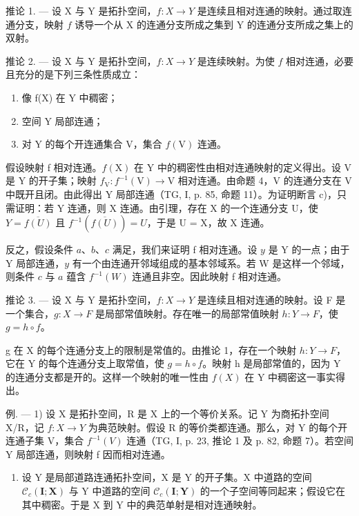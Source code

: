 推论 1. --- 设 X 与 Y 是拓扑空间，\(f: X \to Y\) 是连续且相对连通的映射。通过取连通分支，映射 \(f\) 诱导一个从 X 的连通分支所成之集到 Y 的连通分支所成之集上的双射。

推论 2. --- 设 X 与 Y 是拓扑空间，\(f: X \to Y\) 是连续映射。为使 \(f\) 相对连通，必要且充分的是下列三条性质成立：

\begin{enumerate}
\def\labelenumi{\alph{enumi})}
\item
  像 f(X) 在 Y 中稠密；
\item
  空间 Y 局部连通；
\item
  对 Y 的每个开连通集合 V，集合 \(f(\mathrm{V})\) 连通。
\end{enumerate}

假设映射 f 相对连通。\(f(\mathrm{X})\) 在 Y 中的稠密性由相对连通映射的定义得出。设 V 是 Y 的开子集；映射 \(f_{\mathrm{V}}: f^{-1}(\mathrm{V}) \to \mathrm{V}\) 相对连通。由命题 4，V 的连通分支在 V 中既开且闭。由此得出 Y 局部连通（TG, I, p. 85, 命题 11）。为证明断言 c)，只需证明：若 Y 连通，则 X 连通。由引理，存在 X 的一个连通分支 U，使 \(Y = \overline{f(U)}\) 且 \(f^{-1}(\overline{f(U)}) = U\)，于是 U = X，故 X 连通。

反之，假设条件 \(a\)、\(b\)、\(c\) 满足，我们来证明 f 相对连通。设 \(y\) 是 Y 的一点；由于 Y 局部连通，\(y\) 有一个由连通开邻域组成的基本邻域系。若 W 是这样一个邻域，则条件 \(c\) 与 \(a\) 蕴含 \(f^{-1}(W)\) 连通且非空。因此映射 f 相对连通。

推论 3. --- 设 X 与 Y 是拓扑空间，\(f\colon X\to Y\) 是连续且相对连通的映射。设 F 是一个集合，\(g\colon X\to F\) 是局部常值映射。存在唯一的局部常值映射 \(h\colon Y\to F\)，使 \(g=h\circ f\)。

g 在 X 的每个连通分支上的限制是常值的。由推论 1，存在一个映射 \(h: Y \to F\)，它在 Y 的每个连通分支上取常值，使 \(g = h \circ f\)。映射 h 是局部常值的，因为 Y 的连通分支都是开的。这样一个映射的唯一性由 \(f(X)\) 在 Y 中稠密这一事实得出。

例. --- 1) 设 X 是拓扑空间，R 是 X 上的一个等价关系。记 Y 为商拓扑空间 X/R，记 \(f\colon X \to Y\) 为典范映射。假设 R 的等价类都连通。那么，对 Y 的每个开连通子集 V，集合 \(f^{-1}(V)\) 连通（TG, I, p. 23, 推论 1 及 p. 82, 命题 7）。若空间 Y 局部连通，则映射 f 因而相对连通。

\begin{enumerate}
\def\labelenumi{\arabic{enumi})}
\setcounter{enumi}{1}
\tightlist
\item
  设 Y 是局部道路连通拓扑空间，X 是 Y 的开子集。X 中道路的空间 \(\mathcal{C}_{c}(\mathbf{I};\mathbf{X})\) 与 Y 中道路的空间 \(\mathcal{C}_{c}(\mathbf{I};\mathbf{Y})\) 的一个子空间等同起来；假设它在其中稠密。于是 X 到 Y 中的典范单射是相对连通映射。
\end{enumerate}

